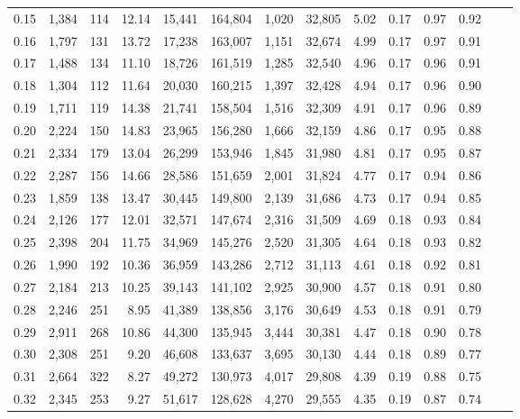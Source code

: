 \begin{tabular}{rrrrrrrrrrrrrr}
0.15 &  1,384 &  114 &   12.14 &   15,441 &  164,804 &   1,020 &  32,805 &  5.02 &  0.17 &  0.97 &      0.92 \\
0.16 &  1,797 &  131 &   13.72 &   17,238 &  163,007 &   1,151 &  32,674 &  4.99 &  0.17 &  0.97 &      0.91 \\
0.17 &  1,488 &  134 &   11.10 &   18,726 &  161,519 &   1,285 &  32,540 &  4.96 &  0.17 &  0.96 &      0.91 \\
0.18 &  1,304 &  112 &   11.64 &   20,030 &  160,215 &   1,397 &  32,428 &  4.94 &  0.17 &  0.96 &      0.90 \\
0.19 &  1,711 &  119 &   14.38 &   21,741 &  158,504 &   1,516 &  32,309 &  4.91 &  0.17 &  0.96 &      0.89 \\
0.20 &  2,224 &  150 &   14.83 &   23,965 &  156,280 &   1,666 &  32,159 &  4.86 &  0.17 &  0.95 &      0.88 \\
0.21 &  2,334 &  179 &   13.04 &   26,299 &  153,946 &   1,845 &  31,980 &  4.81 &  0.17 &  0.95 &      0.87 \\
0.22 &  2,287 &  156 &   14.66 &   28,586 &  151,659 &   2,001 &  31,824 &  4.77 &  0.17 &  0.94 &      0.86 \\
0.23 &  1,859 &  138 &   13.47 &   30,445 &  149,800 &   2,139 &  31,686 &  4.73 &  0.17 &  0.94 &      0.85 \\
0.24 &  2,126 &  177 &   12.01 &   32,571 &  147,674 &   2,316 &  31,509 &  4.69 &  0.18 &  0.93 &      0.84 \\
0.25 &  2,398 &  204 &   11.75 &   34,969 &  145,276 &   2,520 &  31,305 &  4.64 &  0.18 &  0.93 &      0.82 \\
0.26 &  1,990 &  192 &   10.36 &   36,959 &  143,286 &   2,712 &  31,113 &  4.61 &  0.18 &  0.92 &      0.81 \\
0.27 &  2,184 &  213 &   10.25 &   39,143 &  141,102 &   2,925 &  30,900 &  4.57 &  0.18 &  0.91 &      0.80 \\
0.28 &  2,246 &  251 &    8.95 &   41,389 &  138,856 &   3,176 &  30,649 &  4.53 &  0.18 &  0.91 &      0.79 \\
0.29 &  2,911 &  268 &   10.86 &   44,300 &  135,945 &   3,444 &  30,381 &  4.47 &  0.18 &  0.90 &      0.78 \\
0.30 &  2,308 &  251 &    9.20 &   46,608 &  133,637 &   3,695 &  30,130 &  4.44 &  0.18 &  0.89 &      0.77 \\
0.31 &  2,664 &  322 &    8.27 &   49,272 &  130,973 &   4,017 &  29,808 &  4.39 &  0.19 &  0.88 &      0.75 \\
0.32 &  2,345 &  253 &    9.27 &   51,617 &  128,628 &   4,270 &  29,555 &  4.35 &  0.19 &  0.87 &      0.74 \\

\end{tabular}
